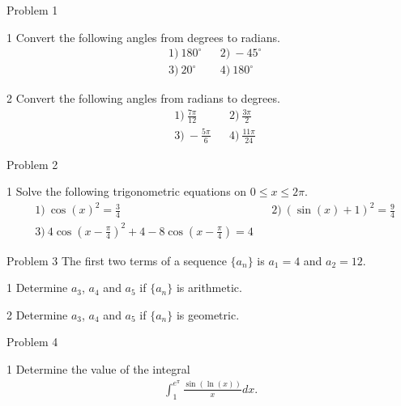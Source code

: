 
\begin{opgavetekst}{Problem 1}
\end{opgavetekst}
%
%
\begin{delopgave}{1}
	Convert the following angles from degrees to radians.
	\begin{align*}
		&1) \ 180^\circ & &2) \ -45^\circ\\
		&3) \ 20^\circ & &4) \ 180^\circ 
	\end{align*}
\end{delopgave}
\begin{delopgave}{2}
	Convert the following angles from radians to degrees.
	\begin{align*}
		&1) \ \frac{7\pi}{12} & &2) \ \frac{3\pi}{2}\\
		&3) \ -\frac{5\pi}{6} & &4) \ \frac{11\pi}{24} 
	\end{align*}
\end{delopgave}
%
%
%
%
%
\begin{opgavetekst}{Problem 2}
\end{opgavetekst}
%
%
\begin{delopgave}{1}
	Solve the following trigonometric equations on $0 \leq x \leq 2\pi$. 
	\begin{align*}
		&1) \ \cos(x)^2 = \frac{3}{4} & &2) \ (\sin(x)+1)^2 = \frac{9}{4}\\
		&3) \ 4\cos\left(x-\frac{\pi}{4}\right)^2+4 - 8\cos\left(x-\frac{\pi}{4}\right) = 4 
	\end{align*}
\end{delopgave}
%
%
%
%
%
\begin{opgavetekst}{Problem 3}
	The first two terms of a sequence $\{a_n\}$ is $a_1 = 4$ and $a_2 = 12$.  
\end{opgavetekst}
\begin{delopgave}{1}
	Determine $a_3$, $a_4$ and $a_5$ if $\{a_n\}$ is arithmetic. 
\end{delopgave}
\begin{delopgave}{2}
	Determine $a_3$, $a_4$ and $a_5$ if $\{a_n\}$ is geometric. 
\end{delopgave}
%
%
%
%
%
\begin{opgavetekst}{Problem 4}
\end{opgavetekst}
\begin{delopgave}{1}
	Determine the value of the integral
	\begin{align*}
		\int_1^{e^{\pi}} \frac{\sin(\ln(x))}{x} dx.
	\end{align*}
\end{delopgave}
